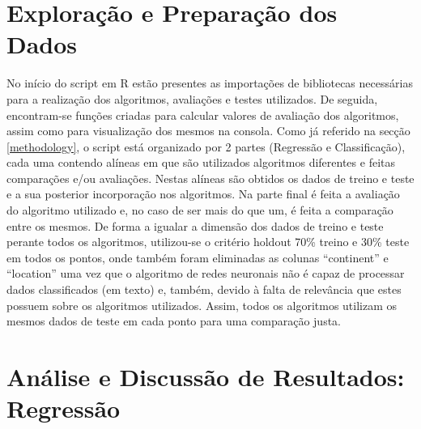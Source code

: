 \documentclass[conference]{IEEEtran}
\begin{document}
\section{Exploração e Preparação dos Dados} %
No início do script em R estão presentes as importações de bibliotecas necessárias para a realização dos algoritmos, avaliações e testes utilizados. De seguida, encontram-se funções criadas para calcular valores de avaliação dos algoritmos, assim como para visualização dos mesmos na consola.
Como já referido na secção \ref{methodology}, o script está organizado por 2 partes (Regressão e Classificação), cada uma contendo alíneas em que são utilizados algoritmos diferentes e feitas comparações e/ou avaliações. Nestas alíneas são obtidos os dados de treino e teste e a sua posterior incorporação nos algoritmos. Na parte final é feita a avaliação do algoritmo utilizado e, no caso de ser mais do que um, é feita a comparação entre os mesmos.
De forma a igualar a dimensão dos dados de treino e teste perante todos os algoritmos, utilizou-se o critério holdout 70\% treino e 30\% teste em todos os pontos, onde também foram eliminadas as colunas “continent” e “location” uma vez que o algoritmo de redes neuronais não é capaz de processar dados classificados (em texto) e, também, devido à falta de relevância que estes possuem sobre os algoritmos utilizados. Assim, todos os algoritmos utilizam os mesmos dados de teste em cada ponto para uma comparação justa.




\section{Análise e Discussão de Resultados: Regressão}
\label{regression} %
\end{document}

